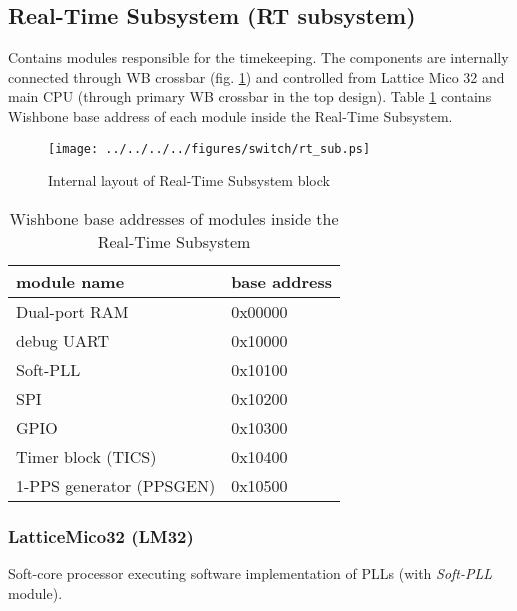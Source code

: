 \subsection{Real-Time Subsystem (RT subsystem)}

Contains modules responsible for the timekeeping. The components are internally connected
through WB crossbar (fig. \ref{fig:rts:hdl}) and controlled from Lattice Mico 32
and main CPU (through primary WB crossbar in the top design). Table
\ref{tab:rts:wb_base} contains Wishbone base address of each module inside the
Real-Time Subsystem.

\begin{figure}[ht]
  \begin{center}
    \texttt{[image: ../../../../figures/switch/rt\_sub.ps]}
    \caption{Internal layout of Real-Time Subsystem block}
    \label{fig:rts:hdl}
  \end{center}
\end{figure}

\begin{table}[ht]
  \begin{center}
  \begin{tabular}{|l|l|}
    \hline
    module name & base address\\
    \hline \hline
    Dual-port RAM & 0x00000\\
    debug UART & 0x10000\\
    Soft-PLL & 0x10100\\
    SPI & 0x10200\\
    GPIO & 0x10300\\
    Timer block (TICS) & 0x10400\\
    1-PPS generator (PPSGEN) & 0x10500\\
    \hline
  \end{tabular}
  \caption{Wishbone base addresses of modules inside the Real-Time Subsystem}
  \label{tab:rts:wb_base}
  \end{center}
\end{table}

\subsubsection{LatticeMico32 (LM32)}

Soft-core processor executing software implementation of PLLs (with
\emph{Soft-PLL} module).\\


